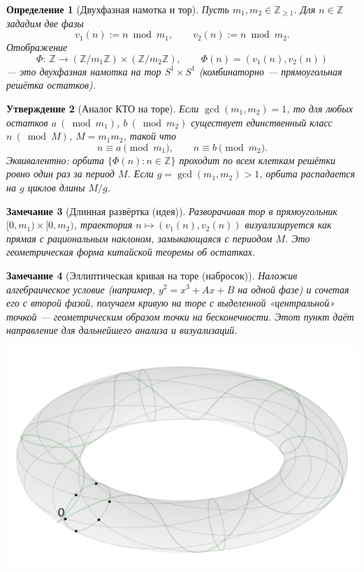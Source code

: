 \documentclass[11pt,a4paper]{article}
\newtheorem{definition}{Определение}[section]
\newtheorem{proposition}[definition]{Утверждение}
\newtheorem{remark}[definition]{Замечание}
\begin{document}
\begin{definition}[Двухфазная намотка и тор]
Пусть $m_1,m_2\in\mathbb Z_{\ge1}$. Для $n\in\mathbb Z$ зададим две фазы
\[
v_1(n):=n\bmod m_1,\qquad v_2(n):=n\bmod m_2.
\]
Отображение
\[
\Phi:\ \mathbb Z\to (\mathbb Z/m_1\mathbb Z)\times(\mathbb Z/m_2\mathbb Z),\qquad
\Phi(n)=(v_1(n),v_2(n))
\]
— это двухфазная намотка на тор $S^1\times S^1$ (комбинаторно — прямоугольная решётка остатков).
\end{definition}

\begin{proposition}[Аналог КТО на торе]
Если $\gcd(m_1,m_2)=1$, то для любых остатков $a\ (\bmod m_1)$, $b\ (\bmod m_2)$ существует единственный
класс $n\ (\bmod M)$, $M=m_1m_2$, такой что
\[
n\equiv a\pmod{m_1},\qquad n\equiv b\pmod{m_2}.
\]
Эквивалентно: орбита $\{\Phi(n):n\in\mathbb Z\}$ проходит по всем клеткам решётки ровно один раз за период $M$.
Если $g=\gcd(m_1,m_2)>1$, орбита распадается на $g$ циклов длины $M/g$.
\end{proposition}

\begin{remark}[Длинная развёртка (идея)]
Разворачивая тор в прямоугольник $[0,m_1)\times[0,m_2)$, траектория $n\mapsto (v_1(n),v_2(n))$
визуализируется как прямая с рациональным наклоном, замыкающаяся с периодом $M$.
Это геометрическая форма китайской теоремы об остатках.
\end{remark}

\begin{remark}[Эллиптическая кривая на торе (набросок)]
Наложив алгебраическое условие (например, $y^2=x^3+Ax+B$ на одной фазе) и сочетая его с второй фазой,
получаем кривую на торе с выделенной «центральной» точкой — геометрическим образом точки на бесконечности.
Этот пункт даёт направление для дальнейшего анализа и визуализаций.
\end{remark}

\begin{center}
  \includegraphics[width=0.85\linewidth]{torus}
\end{center}
\end{document}
